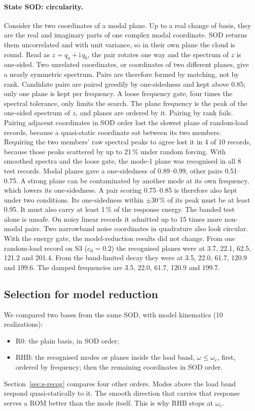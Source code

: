 \documentclass[11pt]{article}
\begin{document}
\paragraph{State SOD: circularity.} Consider the two coordinates of a modal plane. Up to a real change of basis, they are the real and imaginary parts of one complex modal coordinate. SOD returns them uncorrelated and with unit variance, so in their own plane the cloud is round. Read as $z=q_a+\mathrm i\,q_b$, the pair rotates one way and the spectrum of $z$ is one-sided. Two unrelated coordinates, or coordinates of two different planes, give a nearly symmetric spectrum.
Pairs are therefore formed by matching, not by rank. Candidate pairs are paired greedily by one-sidedness and kept above 0.85; only one plane is kept per frequency. A loose frequency gate, four times the spectral tolerance, only limits the search. The plane frequency is the peak of the one-sided spectrum of $z$, and planes are ordered by it.
Pairing by rank fails. Pairing adjacent coordinates in SOD order lost the slowest plane of random-load records, because a quasi-static coordinate sat between its two members. Requiring the two members' raw spectral peaks to agree lost it in 4 of 10 records, because those peaks scattered by up to 21\,\% under random forcing. With smoothed spectra and the loose gate, the mode-1 plane was recognised in all 8 test records. Modal planes gave a one-sidedness of 0.89--0.99, other pairs 0.51--0.75. A strong plane can be contaminated by another mode at its own frequency, which lowers its one-sidedness. A pair scoring 0.75--0.85 is therefore also kept under two conditions. Its one-sidedness within $\pm30\,\%$ of its peak must be at least 0.95. It must also carry at least 1\,\% of the response energy. The banded test alone is unsafe. On noisy linear records it admitted up to 15 times more non-modal pairs. Two narrowband noise coordinates in quadrature also look circular. With the energy gate, the model-reduction results did not change. From one random-load record on S3 ($c_{\mathrm d}=0.2$) the recognised planes were at 3.7, 22.1, 62.5, 121.2 and 201.4. From the band-limited decay they were at 3.5, 22.0, 61.7, 120.9 and 199.6. The damped frequencies are 3.5, 22.0, 61.7, 120.9 and 199.7.

\subsection{Selection for model reduction}\label{sec:romsel}
We compared two bases from the same SOD, with model kinematics (10 realizations):
\begin{itemize}
\item R0: the plain basis, in SOD order;
\item RHB: the recognised modes or planes inside the load band, $\omega\le\omega_{\mathrm c}$, first, ordered by frequency; then the remaining coordinates in SOD order.
\end{itemize}
Section~\ref{sec:s-recog} compares four other orders.
Modes above the load band respond quasi-statically to it. The smooth direction that carries that response serves a ROM better than the mode itself. This is why RHB stops at $\omega_{\mathrm c}$.
\end{document}
